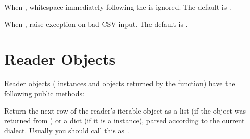 \documentclass[letterpaper,10pt,english]{sphinxmanual}
\begin{document}

\vspace{5px}

\begin{fulllineitems}
\label{\detokenize{csv:csv.Dialect.skipinitialspace}}
When , whitespace immediately following the  is ignored.
The default is .

\end{fulllineitems}


\vspace{5px}

\begin{fulllineitems}
\label{\detokenize{csv:csv.Dialect.strict}}
When , raise exception {\hyperref[\detokenize{csv:csv.Error}]{}} on bad CSV input.
The default is .

\end{fulllineitems}



\section{Reader Objects}
\label{\detokenize{csv:reader-objects}}
Reader objects ({\hyperref[\detokenize{csv:csv.DictReader}]{}} instances and objects returned by the
{\hyperref[\detokenize{csv:csv.reader}]{}} function) have the following public methods:

\vspace{5px}

\begin{fulllineitems}
\label{\detokenize{csv:csv.csvreader.__next__}}
Return the next row of the reader’s iterable object as a list (if the object
was returned from {\hyperref[\detokenize{csv:csv.reader}]{}}) or a dict (if it is a {\hyperref[\detokenize{csv:csv.DictReader}]{}}
instance), parsed according to the current dialect.  Usually you should call
this as .

\end{fulllineitems}
\end{document}
